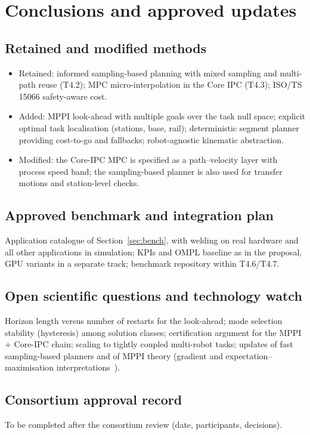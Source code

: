 \section{Conclusions and approved updates}\label{sec:conclusions}

\subsection{Retained and modified methods}
\begin{itemize}
\item Retained: informed sampling-based planning with mixed sampling and multi-path reuse (T4.2); MPC micro-interpolation in the Core IPC (T4.3); ISO/TS 15066 safety-aware cost.
\item Added: MPPI look-ahead with multiple goals over the task null space; explicit optimal task localisation (stations, base, rail); deterministic segment planner providing cost-to-go and fallbacks; robot-agnostic kinematic abstraction.
\item Modified: the Core-IPC MPC is specified as a path--velocity layer with process speed band; the sampling-based planner is also used for transfer motions and station-level checks.
\end{itemize}

\subsection{Approved benchmark and integration plan}
Application catalogue of Section~\ref{sec:bench}, with welding on real hardware and all other applications in simulation; KPIs and OMPL baseline as in the proposal, GPU variants in a separate track; benchmark repository within T4.6/T4.7.

\subsection{Open scientific questions and technology watch}
Horizon length versus number of restarts for the look-ahead; mode selection stability (hysteresis) among solution classes; certification argument for the MPPI + Core-IPC chain; scaling to tightly coupled multi-robot tasks; updates of fast sampling-based planners and of MPPI theory (gradient and expectation--maximisation interpretations~\cite{fazlyab2026mppigd,wang2026mppiem}).

\subsection{Consortium approval record}
\begin{planbox}
To be completed after the consortium review (date, participants, decisions).
\end{planbox}
